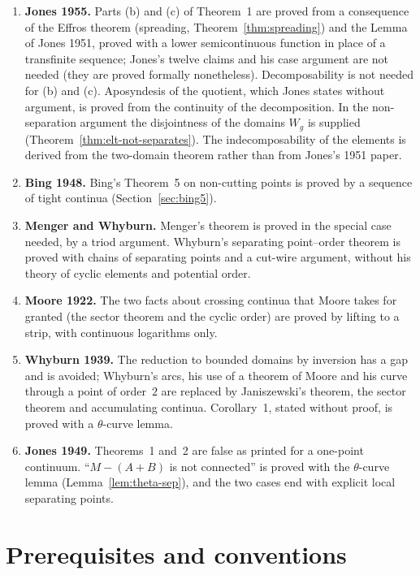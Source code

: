 \begin{enumerate}
\item \textbf{Jones 1955.} Parts (b) and (c) of Theorem~1 are proved from a consequence of the Effros theorem (spreading, Theorem~\ref{thm:spreading}) and the Lemma of Jones
1951, proved with a lower semicontinuous function in place of a transfinite sequence; Jones's twelve claims and his case argument are not needed (they are proved formally
nonetheless). Decomposability is not needed for (b) and (c). Aposyndesis of the quotient, which Jones states without argument, is proved from the continuity of the
decomposition. In the non-separation argument the disjointness of the domains $W_g$ is supplied (Theorem~\ref{thm:elt-not-separates}). The indecomposability of the elements is
derived from the two-domain theorem rather than from Jones's 1951 paper.
\item \textbf{Bing 1948.} Bing's Theorem~5 on non-cutting points is proved by a sequence of tight continua (Section~\ref{sec:bing5}).
\item \textbf{Menger and Whyburn.} Menger's theorem is proved in the special case needed, by a triod argument. Whyburn's separating point--order theorem is proved with chains
of separating points and a cut-wire argument, without his theory of cyclic elements and potential order.
\item \textbf{Moore 1922.} The two facts about crossing continua that Moore takes for granted (the sector theorem and the cyclic order) are proved by lifting to a strip, with
continuous logarithms only.
\item \textbf{Whyburn 1939.} The reduction to bounded domains by inversion has a gap and is avoided; Whyburn's arcs, his use of a theorem of Moore and his curve through a
point of order~$2$ are replaced by Janiszewski's theorem, the sector theorem and accumulating continua. Corollary~1, stated without proof, is proved with a $\theta$-curve lemma.
\item \textbf{Jones 1949.} Theorems~1 and~2 are false as printed for a one-point continuum. ``$M-(A+B)$ is not connected'' is proved with the $\theta$-curve lemma
(Lemma~\ref{lem:theta-sep}), and the two cases end with explicit local separating points.
\end{enumerate}

\section{Prerequisites and conventions}\label{sec:intro-conv}

